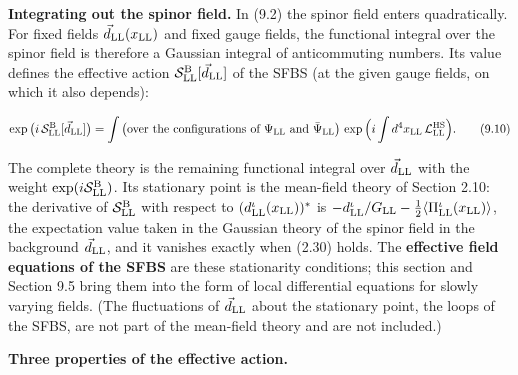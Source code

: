 \documentclass[
  10pt,
]{article}
\begin{document}
\textbf{Integrating out the spinor field.} In (9.2) the spinor field
enters quadratically. For fixed fields \(\vec d_{\rm LL}(x_{\rm LL})\)
and fixed gauge fields, the functional integral over the spinor field is
therefore a Gaussian integral of anticommuting numbers. Its value
defines the effective action
\(\mathcal S^{\rm B}_{\rm LL}[\vec d_{\rm LL}]\) of the SFBS (at the
given gauge fields, on which it also depends):

\[\exp\big(i\,\mathcal S^{\rm B}_{\rm LL}[\vec d_{\rm LL}]\big)=\int\big(\text{over the configurations of }\Psi_{\rm LL}\text{ and }\bar\Psi_{\rm LL}\big)\,\exp\Big(i\int d^4x_{\rm LL}\,\mathcal L^{\rm HS}_{\rm LL}\Big).\tag{9.10}\]

The complete theory is the remaining functional integral over
\(\vec d_{\rm LL}\) with the weight
\(\exp(i\mathcal S^{\rm B}_{\rm LL})\). Its stationary point is the
mean-field theory of Section 2.10: the derivative of
\(\mathcal S^{\rm B}_{\rm LL}\) with respect to
\((d^\iota_{\rm LL}(x_{\rm LL}))^*\) is
\(-d^\iota_{\rm LL}/G_{\rm LL}-\tfrac12\langle\Pi^\iota_{\rm LL}(x_{\rm LL})\rangle\),
the expectation value taken in the Gaussian theory of the spinor field
in the background \(\vec d_{\rm LL}\), and it vanishes exactly when
(2.30) holds. The \textbf{effective field equations of the SFBS} are
these stationarity conditions; this section and Section 9.5 bring them
into the form of local differential equations for slowly varying fields.
(The fluctuations of \(\vec d_{\rm LL}\) about the stationary point, the
loops of the SFBS, are not part of the mean-field theory and are not
included.)

\textbf{Three properties of the effective action.}
\end{document}
